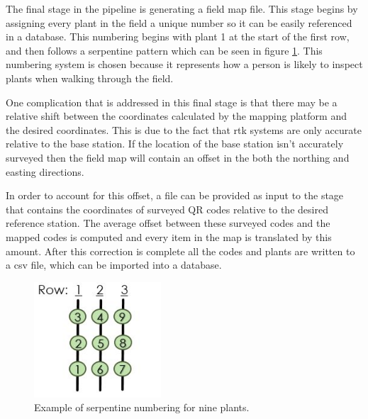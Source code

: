 The final stage in the pipeline is generating a field map file.  This stage begins by assigning every plant in the field a unique number so it can be easily referenced in a database.  This numbering begins with plant 1 at the start of the first row, and then follows a serpentine pattern which can be seen in figure \ref{figure:serpentine}. This numbering system is chosen because it represents how a person is likely to inspect plants when walking through the field.  

One complication that is addressed in this final stage is that there may be a relative shift between the coordinates calculated by the mapping platform and the desired coordinates.  This is due to the fact that \ac{rtk} systems are only accurate relative to the base station.  If the location of the base station isn't accurately surveyed then the field map will contain an offset in the both the northing and easting directions. 

In order to account for this offset, a file can be provided as input to the stage that contains the coordinates of surveyed QR codes relative to the desired reference station.  The average offset between these surveyed codes and the mapped codes is computed and every item in the map is translated by this amount. After this correction is complete all the codes and plants are written to a \ac{csv} file, which can be imported into a database.

\begin{figure}
	\centering
    \includegraphics[height=1.7in]{figures/sepentine.jpg}
    \caption[Serpentine numbering]{Example of serpentine numbering for nine plants.}
    \label{figure:serpentine}
\end{figure}

